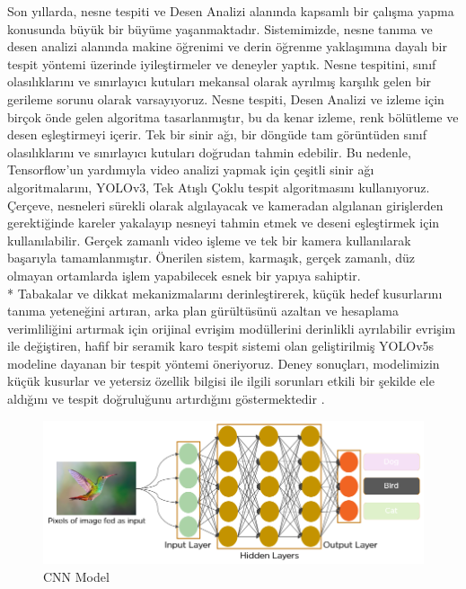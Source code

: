\documentclass[12pt,a4paper]{article}
\begin{document}
		
		
		\clearpage
		
		
		Son yıllarda, nesne tespiti ve Desen Analizi alanında kapsamlı bir çalışma yapma konusunda büyük bir büyüme yaşanmaktadır. Sistemimizde, nesne tanıma ve desen analizi alanında makine öğrenimi ve derin öğrenme yaklaşımına dayalı bir tespit yöntemi üzerinde iyileştirmeler ve deneyler yaptık. Nesne tespitini, sınıf olasılıklarını ve sınırlayıcı kutuları mekansal olarak ayrılmış karşılık gelen bir gerileme sorunu olarak varsayıyoruz. Nesne tespiti, Desen Analizi ve izleme için birçok önde gelen algoritma tasarlanmıştır, bu da kenar izleme, renk bölütleme ve desen eşleştirmeyi içerir. Tek bir sinir ağı, bir döngüde tam görüntüden sınıf olasılıklarını ve sınırlayıcı kutuları doğrudan tahmin edebilir. Bu nedenle, Tensorflow'un yardımıyla video analizi yapmak için çeşitli sinir ağı algoritmalarını, YOLOv3, Tek Atışlı Çoklu tespit algoritmasını kullanıyoruz. Çerçeve, nesneleri sürekli olarak algılayacak ve kameradan algılanan girişlerden gerektiğinde kareler yakalayıp nesneyi tahmin etmek ve deseni eşleştirmek için kullanılabilir. Gerçek zamanlı video işleme ve tek bir kamera kullanılarak başarıyla tamamlanmıştır. Önerilen sistem, karmaşık, gerçek zamanlı, düz olmayan ortamlarda işlem yapabilecek esnek bir yapıya sahiptir\cite{9076486}.			
		\\*				
		Tabakalar ve dikkat mekanizmalarını derinleştirerek, küçük hedef kusurlarını tanıma yeteneğini artıran, arka plan gürültüsünü azaltan ve hesaplama verimliliğini artırmak için orijinal evrişim modüllerini derinlikli ayrılabilir evrişim ile değiştiren, hafif bir seramik karo tespit sistemi olan geliştirilmiş YOLOv5s modeline dayanan bir tespit yöntemi öneriyoruz. Deney sonuçları, modelimizin küçük kusurlar ve yetersiz özellik bilgisi ile ilgili sorunları etkili bir şekilde ele aldığını ve tespit doğruluğunu artırdığını göstermektedir					
		\cite{WAN202211085}.\pagebreak
		
\begin{figure}[h]
	\centering
	\includegraphics[width=\textwidth]{bird.png}
	\caption{CNN Model}
	\label{fig:grafik}
\end{figure}
		
\end{document}

